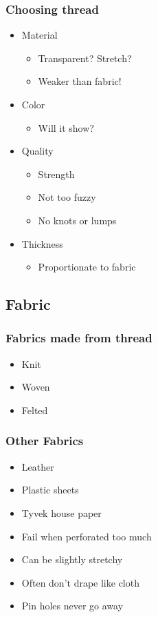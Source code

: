 \documentclass{beamer}
\begin{document}
\begin{frame}[fragile]
\frametitle{Choosing thread}
    \begin{itemize}[<+(1)->]
    \item Material
        \begin{itemize}
            \item Transparent? Stretch?
            \item Weaker than fabric!
        \end{itemize}
    \item Color
        \begin{itemize}
            \item Will it show?
        \end{itemize}
    \item Quality
        \begin{itemize}
            \item Strength
            \item Not too fuzzy
            \item No knots or lumps
        \end{itemize}
    \item Thickness
        \begin{itemize}
            \item Proportionate to fabric
        \end{itemize}
    \end{itemize}
\end{frame}

\subsection{Fabric}

\begin{frame}[fragile]
\tableofcontents[currentsubsection]
\end{frame}

\begin{frame}[fragile]
\frametitle{Fabrics made from thread}
\begin{itemize}[<+(1)->]
\item Knit
\item Woven
\item Felted
\end{itemize}
\end{frame}

\begin{frame}[fragile]
\frametitle{Other Fabrics}
\begin{itemize}[<+(1)->]
\item Leather
\item Plastic sheets
\item Tyvek house paper
\item Fail when perforated too much
\item Can be slightly stretchy
\item Often don't drape like cloth
\item Pin holes never go away
\end{itemize}
\end{frame}
\end{document}
